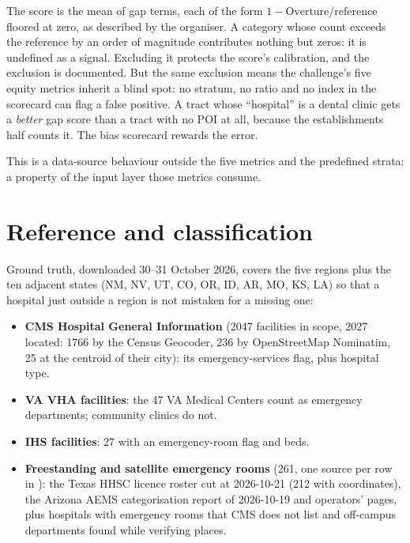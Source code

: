 \documentclass[a4paper]{article}
\begin{document}
The score is the mean of gap terms, each of the form
$1-\text{Overture}/\text{reference}$ floored at zero, as described by the organiser. A category whose count exceeds the
reference by an order of magnitude contributes nothing but zeros: it is undefined as a
signal. Excluding it protects the score's calibration, and the exclusion is documented. But
the same exclusion means the challenge's five equity metrics inherit a blind spot: no stratum,
no ratio and no index in the scorecard can flag a false positive. A tract whose ``hospital''
is a dental clinic gets a \emph{better} gap score than a tract with no POI at all, because
the establishments half counts it. The bias scorecard rewards the error.

This is a data-source behaviour outside the five metrics and the predefined strata: a property of the input
layer those metrics consume.

\section{Reference and classification}

Ground truth, downloaded 30--31 October 2026, covers the five regions plus the ten adjacent
states (NM, NV, UT, CO, OR, ID, AR, MO, KS, LA) so that a hospital just outside a region is
not mistaken for a missing one:

\begin{itemize}
\item \textbf{CMS Hospital General Information} (\num{2047} facilities in scope, \num{2027}
located: \num{1766} by the Census Geocoder, \num{236} by OpenStreetMap Nominatim, 25 at the centroid
of their city): its emergency-services flag, plus hospital type.
\item \textbf{VA VHA facilities}: the \num{47} VA Medical Centers count as emergency
departments; community clinics do not.
\item \textbf{IHS facilities}: \num{27} with an emergency-room flag and beds.
\item \textbf{Freestanding and satellite emergency rooms} (\num{261}, one source per row in
): the Texas HHSC licence roster cut at 2026-10-21
(212 with coordinates), the Arizona AEMS categorisation report of 2026-10-19 and operators' pages,
plus hospitals with emergency rooms that CMS does not list and off-campus departments found while
verifying places.
\end{itemize}
\end{document}
